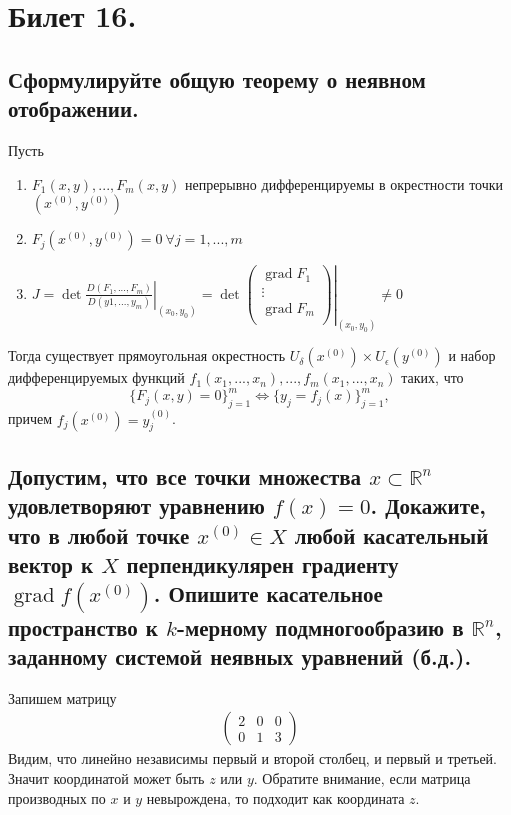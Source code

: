 \section{Билет 16.}

\subsection{Сформулируйте общую теорему о неявном отображении.}
\begin{theorem}
    Пусть
    \begin{enumerate}
        \item $F_1(x,y), ..., F_m(x,y)$ непрерывно дифференцируемы в окрестности точки $(x^{(0)}, y^{(0)})$
        \item $F_j(x^{(0)}, y^{(0)})=0 \> \forall j = 1, ..., m$
        \item $J = \left.
            \det \frac{D(F_1, ..., F_m)}{D(y1, ..., y_m)} 
        \right|_{(x_0, y_0)} = \left.
            \det \begin{pmatrix}
                \operatorname{grad} F_1 \\
                \vdots \\
                \operatorname{grad} F_m \\
            \end{pmatrix}
        \right|_{(x_0, y_0)} \neq 0$
    \end{enumerate}
    Тогда существует прямоугольная окрестность $U_\delta(x^{(0)}) \times U_\epsilon(y^{(0)})$ и набор дифференцируемых функций $f_1(x_1, ..., x_n), ..., f_m(x_1, ..., x_n)$ таких, что 
    \[
        \{
            F_j(x,y) = 0
        \}_{j=1}^m
        \Leftrightarrow
        \{
            y_j = f_j(x)
        \}_{j=1}^m,
    \]
    причем $f_j(x^{(0)}) = y_j^{(0)}$.
\end{theorem}

\subsection{Допустим, что все точки множества $x \subset \mathbb{R}^n$ удовлетворяют уравнению $f(x) = 0$. Докажите, что в любой точке $x^{(0)} \in X$ любой касательный вектор к $X$ перпендикулярен градиенту $\operatorname{grad} f(x^{(0)})$. Опишите касательное пространство к $k$-мерному подмногообразию в $\mathbb{R}^n$, заданному системой неявных уравнений (б.д.).}
Запишем матрицу
\begin{gather*}
\begin{pmatrix}
    2 & 0 & 0\\
    0 & 1 & 3
\end{pmatrix}
\end{gather*}
Видим, что линейно независимы первый и второй столбец, и первый и третьей. Значит координатой может быть $z$ или $y$. Обратите внимание, если матрица производных по $x$ и $y$ невырождена, то подходит как координата $z$.